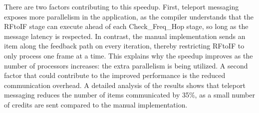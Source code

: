 There are two factors contributing to this speedup.  First, teleport
messaging exposes more parallelism in the application, as the compiler
understands that the RFtoIF stage can execute ahead of each
Check\_Freq\_Hop stage, so long as the message latency is respected.
In contrast, the manual implementation sends an item along the
feedback path on every iteration, thereby restricting RFtoIF to only
process one frame at a time.  This explains why the speedup improves
as the number of processors increases: the extra parallelism is being
utilized.  A second factor that could contribute to the improved
performance is the reduced communication overhead.  A detailed
analysis of the results shows that teleport messaging reduces the
number of items communicated by 35\%, as a small number of credits are
sent compared to the manual implementation.
